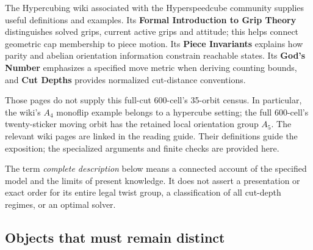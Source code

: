 \documentclass[
  10pt,
  a4paper,
]{article}
\begin{document}
The Hypercubing wiki associated with the Hyperspeedcube community
supplies useful definitions and examples. Its \textbf{Formal
Introduction to Grip Theory} distinguishes solved grips, current active
grips and attitude; this helps connect geometric cap membership to piece
motion. Its \textbf{Piece Invariants} explains how parity and abelian
orientation information constrain reachable states. Its \textbf{God's
Number} emphasizes a specified move metric when deriving counting
bounds, and \textbf{Cut Depths} provides normalized cut-distance
conventions.

Those pages do not supply this full-cut 600-cell's 35-orbit census. In
particular, the wiki's \(A_4\) monoflip example belongs to a hypercube
setting; the full 600-cell's twenty-sticker moving orbit has the
retained local orientation group \(A_5\). The relevant wiki pages are
linked in the reading guide. Their definitions guide the exposition; the
specialized arguments and finite checks are provided here.

The term \emph{complete description} below means a connected account of
the specified model and the limits of present knowledge. It does not
assert a presentation or exact order for its entire legal twist group, a
classification of all cut-depth regimes, or an optimal solver.

\subsection{Objects that must remain
distinct}\label{objects-that-must-remain-distinct}
\end{document}
